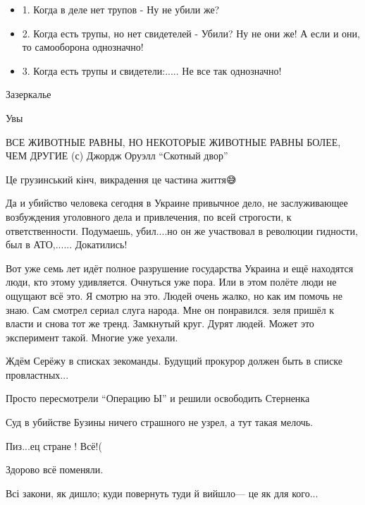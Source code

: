 \begin{itemize}
\begin{itemize}
\item 1. Когда в деле нет трупов - Ну не убили же? 
\item 2.  Когда есть трупы, но нет свидетелей - Убили? Ну не они же! А если и они, то
самооборона однозначно! 
\item 3. Когда есть трупы и свидетели:..... Не все так однозначно!
\end{itemize}


Зазеркалье

Увы


ВСЕ ЖИВОТНЫЕ РАВНЫ, НО НЕКОТОРЫЕ ЖИВОТНЫЕ РАВНЫ БОЛЕЕ, ЧЕМ ДРУГИЕ (с)
Джордж Оруэлл \enquote{Скотный двор}


Це грузинський кінч, викрадення це частина життя😅


Да и убийство человека сегодня в Украине привычное дело, не заслуживающее
возбуждения уголовного дела и привлечения, по всей строгости, к
ответственности. Подумаешь, убил....но он же участвовал в революции гидности,
был в АТО,...... Докатились!


Вот уже семь лет идёт полное разрушение государства Украина и ещё находятся
люди, кто этому удивляется. Очнуться уже пора. Или в этом полёте люди не
ощущают всё это. Я смотрю на это. Людей очень жалко, но как им помочь не знаю.
Сам смотрел сериал слуга народа. Мне он понравился. зеля пришёл к власти и
снова тот же тренд. Замкнутый круг. Дурят людей. Может это эксперимент такой.
Многие уже уехали.

Ждём Серёжу в списках зекоманды. Будущий прокурор должен быть в списке провластных...

Просто пересмотрели \enquote{Операцию Ы} и решили освободить Стерненка

Суд в убийстве Бузины ничего страшного не узрел, а тут такая мелочь.

Пиз...ец стране ! Всё!(

Здорово всё поменяли.

Всі закони, як дишло; куди повернуть туди й вийшло— це як для кого...


\end{itemize}
